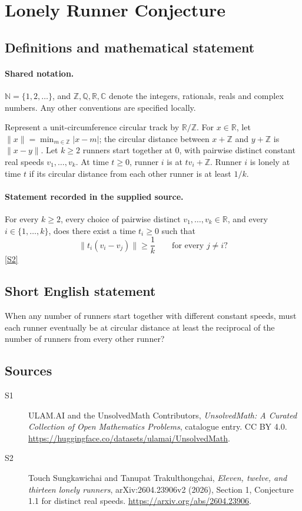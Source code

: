 \documentclass[11pt]{article}
\newcommand{\sref}[2]{\hyperlink{source:#1:#2}{[S#2]}}
\begin{document}
\section{Lonely Runner Conjecture}\label{statement}

\subsection{Definitions and mathematical statement}

\paragraph{Shared notation.}$\mathbb N=\{1,2,\ldots\}$, and $\mathbb Z,\mathbb Q,\mathbb R,\mathbb C$ denote the integers, rationals, reals and complex numbers. Any other conventions are specified locally.


Represent a unit-circumference circular track by \(\mathbb R/\mathbb Z\).
For \(x\in\mathbb R\), let \(\|x\|=\min_{m\in\mathbb Z}|x-m|\);
the circular distance between \(x+\mathbb Z\) and \(y+\mathbb Z\)
is \(\|x-y\|\). Let \(k\ge2\) runners start together at \(0\),
with pairwise distinct constant real speeds \(v_1,\ldots,v_k\).
At time \(t\ge0\), runner \(i\) is at \(tv_i+\mathbb Z\).
Runner \(i\) is lonely at time \(t\) if its circular distance from
each other runner is at least \(1/k\).
\paragraph{Statement recorded in the supplied source.}
For every \(k\ge2\), every choice of pairwise distinct
\(v_1,\ldots,v_k\in\mathbb R\), and every
\(i\in\{1,\ldots,k\}\), does there exist a time \(t_i\ge0\) such that
\[
          \|t_i(v_i-v_j)\|\ge\frac1k
                 \qquad\text{for every }j\ne i?
\] \sref{statement}{2}
\subsection{Short English statement}
When any number of runners start together with different constant speeds, must each runner eventually be at circular distance at least the reciprocal of the number of runners from every other runner?
\subsection{Sources}
\begin{description}
\item[\hypertarget{source:statement:1}{S1}] ULAM.AI and the UnsolvedMath Contributors, \emph{UnsolvedMath: A Curated Collection of Open Mathematics Problems}, catalogue entry. CC BY 4.0. \url{https://huggingface.co/datasets/ulamai/UnsolvedMath}.
\item[\hypertarget{source:statement:2}{S2}] Touch Sungkawichai and Tanupat Trakulthongchai, \emph{Eleven, twelve, and thirteen lonely runners}, arXiv:2604.23906v2 (2026), Section 1, Conjecture 1.1 for distinct real speeds. \url{https://arxiv.org/abs/2604.23906}.
\end{description}
\label{end:statement}
\end{document}
